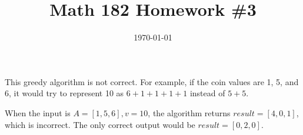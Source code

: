 \documentclass{article}
\date{\today}
\title{Math 182 Homework \#3}
\begin{document}
\maketitle

\begin{prob}
\end{prob}
This greedy algorithm is not correct. For example, if the coin values are 1, 5, and 6, it would try to represent 10 as $6+1+1+1+1$ instead of $5+5$.
\par
When the input is $A=[1,5,6],v=10$, the algorithm returns $result=[4,0,1]$, which is incorrect. The only correct output would be $result=[0,2,0]$.


\end{document}
